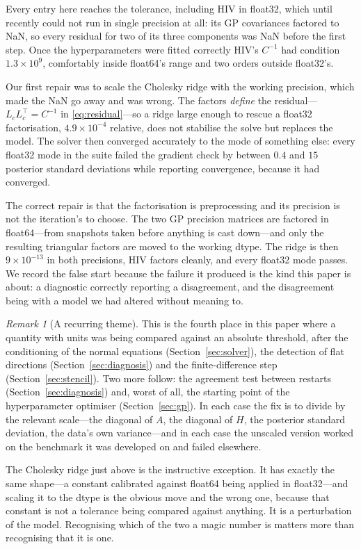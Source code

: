 \documentclass[11pt]{article}
\theoremstyle{plain}
\theoremstyle{definition}
\theoremstyle{remark}
\newtheorem{remark}{Remark}
\begin{document}
Every entry here reaches the tolerance, including HIV in float32, which until recently could not
run in single precision at all: its GP covariances factored to NaN, so every residual for two of
its three components was NaN before the first step. Once the hyperparameters were fitted correctly
HIV's $C^{-1}$ had condition $1.3\times10^{9}$, comfortably inside float64's range and two orders
outside float32's.

Our first repair was to scale the Cholesky ridge with the working precision, which made the NaN go
away and was wrong. The factors \emph{define} the residual---$L_cL_c^\top = C^{-1}$ in
\eqref{eq:residual}---so a ridge large enough to rescue a float32 factorisation, $4.9\times10^{-4}$
relative, does not stabilise the solve but replaces the model. The solver then converged accurately
to the mode of something else: every float32 mode in the suite failed the gradient check by between
$0.4$ and $15$ posterior standard deviations while reporting convergence, because it had converged.

The correct repair is that the factorisation is preprocessing and its precision is not the
iteration's to choose. The two GP precision matrices are factored in float64---from snapshots taken
before anything is cast down---and only the resulting triangular factors are moved to the working
dtype. The ridge is then $9\times10^{-13}$ in both precisions, HIV factors cleanly, and every
float32 mode passes. We record the false start because the failure it produced is the kind this
paper is about: a diagnostic correctly reporting a disagreement, and the disagreement being with a
model we had altered without meaning to.

\begin{remark}[A recurring theme]
This is the fourth place in this paper where a quantity with units was being compared against an
absolute threshold, after the conditioning of the normal equations (Section~\ref{sec:solver}), the
detection of flat directions (Section~\ref{sec:diagnosis}) and the finite-difference step
(Section~\ref{sec:stencil}). Two more follow: the agreement test between restarts
(Section~\ref{sec:diagnosis}) and, worst of all, the starting point of the hyperparameter optimiser
(Section~\ref{sec:gp}). In each case the fix is to divide by the relevant scale---the diagonal of
$A$, the diagonal of $H$, the posterior standard deviation, the data's own variance---and in each
case the unscaled version worked on the benchmark it was developed on and failed elsewhere.

The Cholesky ridge just above is the instructive exception. It has exactly the same shape---a
constant calibrated against float64 being applied in float32---and scaling it to the dtype is the
obvious move and the wrong one, because that constant is not a tolerance being compared against
anything. It is a perturbation of the model. Recognising which of the two a magic number is
matters more than recognising that it is one.
\end{remark}
\end{document}
